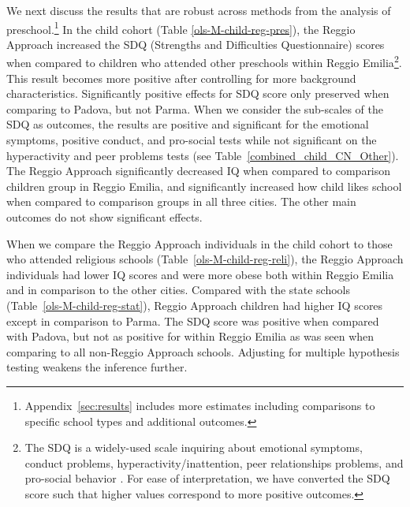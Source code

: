 We next discuss the results that are robust across methods from the analysis of preschool.\footnote{Appendix~\ref{sec:results} includes more estimates including comparisons to specific school types and additional outcomes.} In the child cohort (Table \ref{ols-M-child-reg-pres}), the Reggio Approach increased the SDQ (Strengths and Difficulties Questionnaire) scores when compared to children who attended other preschools within Reggio Emilia\footnote{The SDQ is a widely-used scale inquiring about emotional symptoms, conduct problems, hyperactivity/inattention, peer relationships problems, and pro-social behavior \citep{Goodman_1997_JCPP}. For ease of interpretation, we have converted the SDQ score such that higher values correspond to more positive outcomes.}. This result becomes more positive after controlling for more background characteristics. Significantly positive effects for SDQ score only preserved when comparing to Padova, but not Parma. When we consider the sub-scales of the SDQ as outcomes, the results are positive and significant for the emotional symptoms, positive conduct, and pro-social tests while not significant on the hyperactivity and peer problems tests (see Table~\ref{combined_child_CN_Other}). The Reggio Approach significantly decreased IQ when compared to comparison children group in Reggio Emilia, and significantly increased how child likes school when compared to comparison groups in all three cities. The other main outcomes do not show significant effects.

When we compare the Reggio Approach individuals in the child cohort to those who attended religious schools (Table~\ref{ols-M-child-reg-reli}), the Reggio Approach individuals had lower IQ scores and were more obese both within Reggio Emilia and in comparison to the other cities. Compared with the state schools (Table~\ref{ols-M-child-reg-stat}), Reggio Approach children had higher IQ scores except in comparison to Parma. The SDQ score was positive when compared with Padova, but not as positive for within Reggio Emilia as was seen when comparing to all non-Reggio Approach schools. Adjusting for multiple hypothesis testing weakens the inference further.

